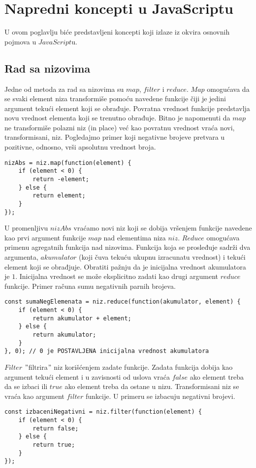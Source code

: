 \section{Napredni koncepti u JavaScriptu}

U ovom poglavlju biće predstavljeni koncepti koji izlaze iz okvira osnovnih pojmova u $JavaScript$u.

\subsection{Rad sa nizovima}

Jedne od metoda za rad sa nizovima su $map$, $filter$ i $reduce$.
$Map$ omogućava da se svaki element niza transformiše pomoću navedene funkcije čiji je jedini argument tekući element koji se obrađuje. Povratna vrednost funkcije predstavlja novu vrednost elementa koji se trenutno obrađuje. Bitno je napomenuti da $map$ ne transformiše polazni niz (in place) već kao povratnu vrednost vraća novi, transformisani, niz. Pogledajmo primer koji negativne brojeve pretvara u pozitivne, odnosno, vrši apsolutnu vrednost broja.
\begin{lstlisting}[backgroundcolor = \color{lightgray}, breaklines=true]
nizAbs = niz.map(function(element) {
    if (element < 0) {
        return -element;
    } else {
	    return element;
    }
});
\end{lstlisting}
U promenljivu $nizAbs$ vraćamo novi niz koji se dobija vršenjem funkcije navedene kao prvi argument funkcije $map$ nad elementima niza $niz$.
$Reduce$ omogućava primenu agregatnih funkcija nad nizovima. Funkcija koja se prosleđuje sadrži dva argumenta, $akumulator$ (koji čuva tekuću ukupnu izracunatu vrednost) i tekući element koji se obrađjuje. Obratiti pažnju da je inicijalna vrednost akumulatora je $1$. Inicijalna vrednost se može eksplicitno zadati kao drugi argument $reduce$ funkcije. Primer računa sumu negativnih parnih brojeva.
\begin{lstlisting}[backgroundcolor = \color{lightgray}, breaklines=true]
const sumaNegElemenata = niz.reduce(function(akumulator, element) {
    if (element < 0) {
        return akumulator + element;
    } else {
        return akumulator;
    }
}, 0); // 0 je POSTAVLJENA inicijalna vrednost akumulatora
\end{lstlisting}


$Filter$ $"$filtrira$"$ niz korišćenjem zadate funkcije. Zadata funkcija dobija kao argument tekući element i u zavisnosti od uslova vraća $false$ ako element treba da se izbaci ili $true$ ako element treba da ostane u nizu. Transformisani niz se vraća kao argument $filter$ funkcije. U primeru se izbacuju negativni brojevi.
\begin{lstlisting}[backgroundcolor = \color{lightgray}, breaklines=true]
const izbaceniNegativni = niz.filter(function(element) {
    if (element < 0) {
        return false;
    } else {
        return true;
    }
});
\end{lstlisting}

